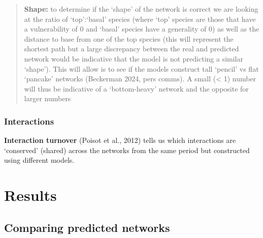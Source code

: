 \documentclass[
]{article}
\begin{document}
\begin{quote}
\textbf{Shape:} to determine if the `shape' of the network is correct we
are looking at the ratio of `top':`basal' species (where `top' species
are those that have a vulnerability of 0 and `basal' species have a
generality of 0) as well as the distance to base from one of the top
species (this will represent the shortest path but a large discrepancy
between the real and predicted network would be indicative that the
model is not predicting a similar `shape'). This will allow is to see if
the models construct tall `pencil' vs flat `pancake' networks (Beckerman
2024, pers comms). A small (\textless{} 1) number will thus be
indicative of a `bottom-heavy' network and the opposite for larger
numbers
\end{quote}

\subsubsection{Interactions}\label{interactions}

\textbf{Interaction turnover} (Poisot et al., 2012) tells us which
interactions are `conserved' (shared) across the networks from the same
period but constructed using different models.

\section{Results}\label{results}

\subsection{Comparing predicted
networks}\label{comparing-predicted-networks}
\end{document}
